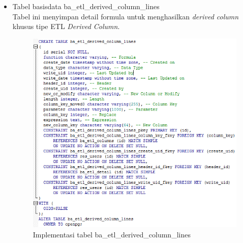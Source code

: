 \begin{itemize}
		\item Tabel basisdata ba\_etl\_derived\_column\_lines\\
		Tabel ini menyimpan detail formula untuk menghasilkan \textit{derived column} khusus tipe ETL \textit{Derived Column}.
		\begin{figure}[H]
		\centering
		\includegraphics[scale=0.5]{Gambar/tabel-ba-etl-dericed-column-lines}
		\caption{Implementasi tabel ba\_etl\_derived\_column\_lines}
		\end{figure}
		

\end{itemize}
